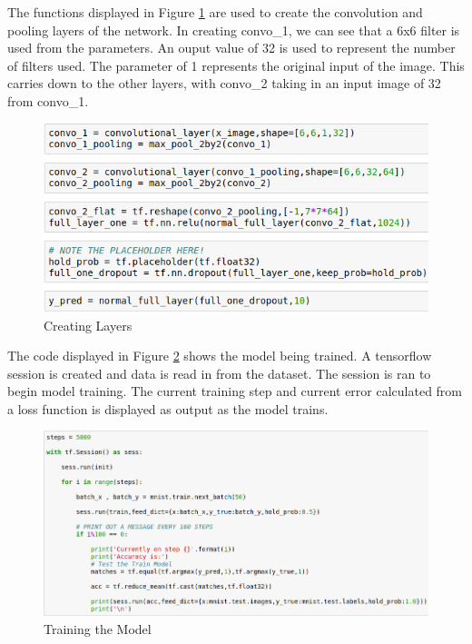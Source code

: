 \documentclass[12pt]{report}
\begin{document}
\begin{flushleft}
The functions displayed in Figure \ref{fig:layers} are used to create the convolution and pooling layers of the network. In creating convo\_1, we can see that a 6x6 filter is used from the parameters. An ouput value of 32 is used to represent the number of filters used. The parameter of 1 represents the original input of the image. This carries down to the other layers, with convo\_2 taking in an input image of 32 from convo\_1.
\end{flushleft}

\vspace{0.5cm}
\begin{figure}[h]
	\centering
	\includegraphics[width=12cm]{layers}
	\caption{Creating Layers}
	\label{fig:layers}
\end{figure}

\begin{flushleft}
The code displayed in Figure \ref{fig:training} shows the model being trained. A tensorflow session is created and data is read in from the dataset. The session is ran to begin model training. The current training step and current error calculated from a loss function is displayed as output as the model trains.
\end{flushleft}

\vspace{0.5cm}
\begin{figure}[h]
	\centering
	\includegraphics[width=12cm]{training}
	\caption{Training the Model}
	\label{fig:training}
\end{figure}
\end{document}
